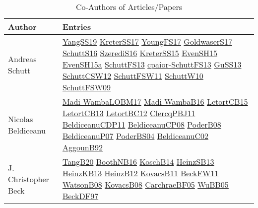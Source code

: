 {\scriptsize
\begin{longtable}{p{4cm}p{20cm}}
\caption{Co-Authors of Articles/Papers}\\ \toprule
Author & Entries \\ \midrule\endhead
\bottomrule
\endfoot
Andreas Schutt & \href{papers/YangSS19.pdf}{YangSS19}\cite{YangSS19} \href{articles/KreterSS17.pdf}{KreterSS17}\cite{KreterSS17} \href{papers/YoungFS17.pdf}{YoungFS17}\cite{YoungFS17} \href{papers/GoldwaserS17.pdf}{GoldwaserS17}\cite{GoldwaserS17} \href{papers/SchuttS16.pdf}{SchuttS16}\cite{SchuttS16} \href{papers/SzerediS16.pdf}{SzerediS16}\cite{SzerediS16} \href{papers/KreterSS15.pdf}{KreterSS15}\cite{KreterSS15} \href{papers/EvenSH15.pdf}{EvenSH15}\cite{EvenSH15} \href{articles/EvenSH15a.pdf}{EvenSH15a}\cite{EvenSH15a} \href{papers/SchuttFS13.pdf}{SchuttFS13}\cite{SchuttFS13} \href{papers/cpaior-SchuttFS13.pdf}{cpaior-SchuttFS13}\cite{cpaior-SchuttFS13} \href{papers/GuSS13.pdf}{GuSS13}\cite{GuSS13} \href{papers/SchuttCSW12.pdf}{SchuttCSW12}\cite{SchuttCSW12} \href{articles/SchuttFSW11.pdf}{SchuttFSW11}\cite{SchuttFSW11} \href{papers/SchuttW10.pdf}{SchuttW10}\cite{SchuttW10} \href{papers/SchuttFSW09.pdf}{SchuttFSW09}\cite{SchuttFSW09} \\
Nicolas Beldiceanu & \href{papers/Madi-WambaLOBM17.pdf}{Madi-WambaLOBM17}\cite{Madi-WambaLOBM17} \href{papers/Madi-WambaB16.pdf}{Madi-WambaB16}\cite{Madi-WambaB16} \href{articles/LetortCB15.pdf}{LetortCB15}\cite{LetortCB15} \href{papers/LetortCB13.pdf}{LetortCB13}\cite{LetortCB13} \href{papers/LetortBC12.pdf}{LetortBC12}\cite{LetortBC12} \href{papers/ClercqPBJ11.pdf}{ClercqPBJ11}\cite{ClercqPBJ11} \href{articles/BeldiceanuCDP11.pdf}{BeldiceanuCDP11}\cite{BeldiceanuCDP11} \href{papers/BeldiceanuCP08.pdf}{BeldiceanuCP08}\cite{BeldiceanuCP08} \href{papers/PoderB08.pdf}{PoderB08}\cite{PoderB08} \href{papers/BeldiceanuP07.pdf}{BeldiceanuP07}\cite{BeldiceanuP07} \href{articles/PoderBS04.pdf}{PoderBS04}\cite{PoderBS04} \href{papers/BeldiceanuC02.pdf}{BeldiceanuC02}\cite{BeldiceanuC02} \href{papers/AggounB92.pdf}{AggounB92}\cite{AggounB92} \\
J. Christopher Beck & \href{papers/TangB20.pdf}{TangB20}\cite{TangB20} \href{papers/BoothNB16.pdf}{BoothNB16}\cite{BoothNB16} \href{papers/KoschB14.pdf}{KoschB14}\cite{KoschB14} \href{articles/HeinzSB13.pdf}{HeinzSB13}\cite{HeinzSB13} \href{papers/HeinzKB13.pdf}{HeinzKB13}\cite{HeinzKB13} \href{papers/HeinzB12.pdf}{HeinzB12}\cite{HeinzB12} \href{articles/KovacsB11.pdf}{KovacsB11}\cite{KovacsB11} \href{articles/BeckFW11.pdf}{BeckFW11}\cite{BeckFW11} \href{papers/WatsonB08.pdf}{WatsonB08}\cite{WatsonB08} \href{articles/KovacsB08.pdf}{KovacsB08}\cite{KovacsB08} \href{papers/CarchraeBF05.pdf}{CarchraeBF05}\cite{CarchraeBF05} \href{papers/WuBB05.pdf}{WuBB05}\cite{WuBB05} \href{papers/BeckDF97.pdf}{BeckDF97}\cite{BeckDF97} \\

\end{longtable}}
